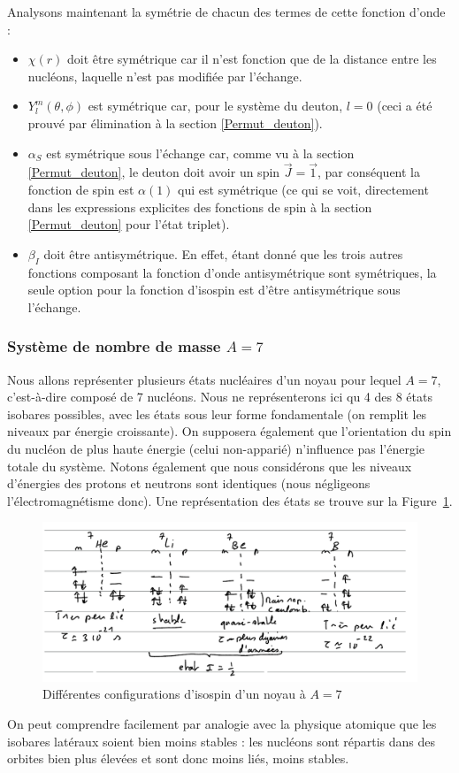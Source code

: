 Analysons maintenant la symétrie de chacun des termes de cette fonction d'onde :
\begin{itemize}
    \item $\chi(r)$ doit être symétrique car il n'est fonction que de la distance entre les nucléons, laquelle n'est pas modifiée par l'échange.
    \item $Y_l^m(\theta,\phi)$ est symétrique car, pour le système du deuton, $l=0$ (ceci a été prouvé par élimination à la section \ref{Permut_deuton}).
    \item $\alpha_S$ est symétrique sous l'échange car, comme vu à la section \ref{Permut_deuton}, le deuton doit avoir un spin $\vec{J}=\vec{1}$, par conséquent la fonction de spin est $\alpha(1)$ qui est symétrique (ce qui se voit, directement dans les expressions explicites des fonctions de spin à la section \ref{Permut_deuton} pour l'état triplet).
    \item $\beta_I$ doit être antisymétrique. En effet, étant donné que les trois autres fonctions composant la fonction d'onde antisymétrique sont symétriques, la seule option pour la fonction d'isospin est d'être antisymétrique sous l'échange.
\end{itemize}


\subsubsection{Système de nombre de masse $A=7$}
Nous allons représenter plusieurs états nucléaires d'un noyau pour lequel $A=7$, c'est-à-dire composé de 7 nucléons. Nous ne représenterons ici qu 4 des 8 états isobares possibles, avec les états sous leur forme fondamentale (on remplit les niveaux par énergie croissante). On supposera également que l'orientation du spin du nucléon de plus haute énergie (celui non-apparié) n'influence pas l'énergie totale du système.
Notons également que nous considérons que les niveaux d'énergies des protons et neutrons sont identiques (nous négligeons l'électromagnétisme donc). Une représentation des états se trouve sur la Figure~\ref{fig:}.
\begin{figure}[htpb]
    \centering
    \includegraphics[scale=0.7]{Images4/A7.PNG}
    \caption{Différentes configurations d'isospin d'un noyau à $A = 7$}
    \label{fig:}
\end{figure}
On peut comprendre facilement par analogie avec la physique atomique que les isobares latéraux soient bien moins stables : les nucléons sont répartis dans des orbites bien plus élevées et sont donc moins liés, moins stables.

